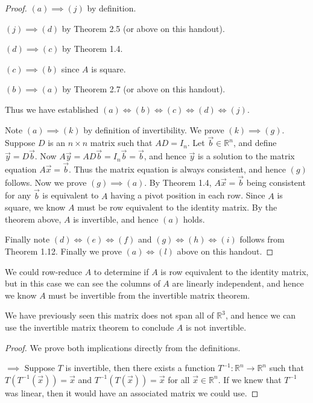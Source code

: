 \documentclass[12pt,letterpaper]{article}
\begin{document}
\begin{enumerate}
\begin{proof}
 $(a)\implies (j)$ by definition.
 
 $(j) \implies (d)$ by Theorem 2.5 (or above on this handout).
 
 $(d) \implies (c)$ by Theorem 1.4.
 
 $(c) \implies (b)$ since $A$ is square.
 
 $(b) \implies (a)$ by Theorem 2.7 (or above on this handout).
 
 Thus we have established $(a) \iff (b) \iff (c) \iff (d) \iff (j)$.
 
Note $(a)\implies (k)$ by definition of invertibility. We prove $(k) \implies (g)$. Suppose $D$ is an $n\times n$ matrix such that $AD=I_n$. Let $\vec{b} \in \mathbb{R}^n$, and define $\vec{y} =D\vec{b}$. Now $A\vec{y}=AD\vec{b} =I_n\vec{b} =\vec{b}$, and hence $\vec{y}$ is a solution to the matrix equation $A\vec{x}=\vec{b}$. Thus the matrix equation is always consistent, and hence $(g)$ follows. Now we prove $(g)\implies (a)$. By Theorem 1.4, $A\vec{x}=\vec{b}$ being consistent for any $\vec{b}$ is equivalent to $A$ having a pivot position in each row. Since $A$ is square, we know $A$ must be row equivalent to the identity matrix. By the theorem above, $A$ is invertible, and hence $(a)$ holds. 

Finally note $(d) \iff (e) \iff (f)$ and $(g) \iff (h) \iff (i)$ follows from Theorem 1.12. Finally we prove $(a)\iff (l)$ above on this handout.
 \end{proof}
  
  \Answer 
  
  \begin{enumerate}
  \Part We could row-reduce $A$ to determine if $A$ is row equivalent to the identity matrix, but in this case we can see the columns of $A$ are linearly independent, and hence we know $A$ must be invertible from the invertible matrix theorem.
  
  \Part We have previously seen this matrix does not span all of $\mathbb{R}^3$, and hence we can use the invertible matrix theorem to conclude $A$ is not invertible.
  
  \end{enumerate}
  
  \Answer
  
  \begin{proof} We prove both implications directly from the definitions.
  
  $\implies$ Suppose $T$ is invertible, then there exists a function $T^{-1} : \mathbb{R}^n \to \mathbb{R}^n$ such that $T(T^{-1}(\vec{x}))=\vec{x}$ and $T^{-1}(T(\vec{x}))=\vec{x}$ for all $\vec{x} \in \mathbb{R}^n$. If we knew that $T^{-1}$ was linear, then it would have an associated matrix we could use.
  

\end{proof}
\end{enumerate}
\end{document}
